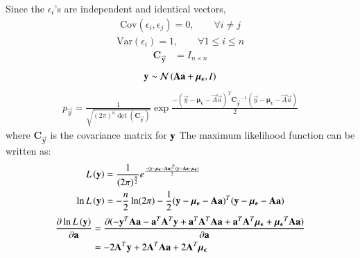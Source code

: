 \documentclass[journal,12pt,onecolumn]{IEEEtran}
\theoremstyle{remark}
\begin{document}
 Since the ${\epsilon}_i$'s are independent and identical vectors, 
\begin{align}
\textrm{Cov}({\epsilon}_i,{\epsilon}_j)=0 , \qquad \forall i\neq j
\end{align}
\begin{align}
\textrm{Var}({\epsilon}_i)=1 , \qquad \forall 1\leq i\leq n
\end{align}
\begin{align}
 \mathbf{C_{\vec{y}}}&=I_{n\times n}
 \end{align}
\begin{align}
\vec{y} \sim \gauss{\vec{A}\vec{a}+{\boldsymbol{\mu}}_{\boldsymbol{{\epsilon}}}}{I}
\end{align}
\begin{align}
p_{\vec{y}}= \frac{1}{\sqrt{ (2\pi)^n \det( \mathbf{C_{\vec{y}}})}} \exp \frac{-({\vec{y}-{\boldsymbol{\mu}}_{\boldsymbol{{\epsilon}}}}-\vec{A}\vec{a})^T{\mathbf{C_{\vec{y}}}^{-1}}{({\vec{y}-{\boldsymbol{\mu}}_{\boldsymbol{{\epsilon}}}}-\vec{A}\vec{a})}}{2}
\end{align}
where $ \mathbf{C_{\vec{y}}} $ is the covariance matrix for $\vec{y}\\$
The maximum likelihood function can be written as:
\begin{align}
L\brak{\vec{y}}&=\frac{1}{{(2\pi)}^{\frac{n}{2}}}e^\frac{-({\vec{y}-{\boldsymbol{\mu}}_{\boldsymbol{{\epsilon}}}}-\vec{A}\vec{a})^T{({\vec{y}-\vec{A}\vec{a}-{\boldsymbol{\mu}}_{\boldsymbol{{\epsilon}}}})}}{2}\\
\ln L\brak{\vec{y}}&=-\frac{n}{2}\ln(2\pi)-\dfrac12 ({\vec{y}-{\boldsymbol{\mu}}_{\boldsymbol{{\epsilon}}}}-\vec{A}\vec{a})^T{({\vec{y}-{\boldsymbol{\mu}}_{\boldsymbol{{\epsilon}}}}-\vec{A}\vec{a})}
\end{align}
\begin{align}
\frac{\partial \ln L\brak{\vec{y}}}{\partial \vec{a}}&=\frac{\partial (-\vec{y}^T\vec{A}\vec{a}-\vec{a}^T\vec{A}^T\vec{y}+\vec{a}^T\vec{A}^T\vec{A}\vec{a}+\vec{a}^T\vec{A}^T\vec{\boldsymbol{\mu}}_{\boldsymbol{{\epsilon}}}+{\vec{\boldsymbol{\mu}}_{\boldsymbol{{\epsilon}}}}^T\vec{A}\vec{a})}{\partial \vec{a}}\\
&=-2\vec{A}^T\vec{y}+2\vec{A}^T\vec{A}\vec{a}+2\vec{A}^T\vec{\boldsymbol{\mu}}_{\boldsymbol{{\epsilon}}}
\end{align}
\end{document}
